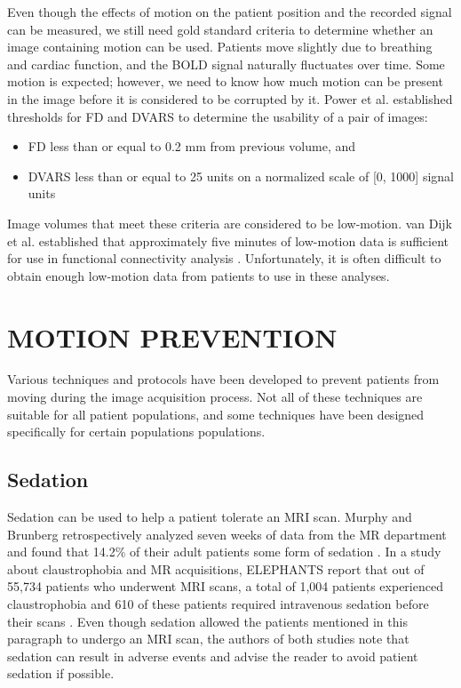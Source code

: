 Even though the effects of motion on the patient position and the recorded signal can be measured, we still need gold standard criteria to determine whether an image containing motion can be used. Patients move slightly due to breathing and cardiac function, and the BOLD signal naturally fluctuates over time. Some motion is expected; however, we need to know how much motion can be present in the image before it is considered to be corrupted by it. Power et al. established thresholds for FD and DVARS to determine the usability of a pair of images:
\begin{itemize}
\item FD less than or equal to 0.2 mm from previous volume, and
\item DVARS less than or equal to 25 units on a normalized scale of [0, 1000] signal units \cite{Power2014}
\end{itemize}

Image volumes that meet these criteria are considered to be low-motion. van Dijk et al. established that approximately five minutes of low-motion data is sufficient for use in functional connectivity analysis \cite{VanDijk2012}. Unfortunately, it is often difficult to obtain enough low-motion data from patients to use in these analyses.

\section{MOTION PREVENTION}

Various techniques and protocols have been developed to prevent patients from moving during the image acquisition process. Not all of these techniques are suitable for all patient populations, and some techniques have been designed specifically for certain populations populations.

\subsection{Sedation}

Sedation can be used to help a patient tolerate an MRI scan. Murphy and Brunberg retrospectively analyzed seven weeks of data from the MR department and found that 14.2\% of their adult patients some form of sedation \cite{Murphy1997}. In a study about claustrophobia and MR acquisitions, ELEPHANTS report that out of 55,734 patients who underwent MRI scans, a total of 1,004 patients experienced claustrophobia and 610 of these patients required intravenous sedation before their scans \cite{Dewey2007}. Even though sedation allowed the patients mentioned in this paragraph to undergo an MRI scan, the authors of both studies note that sedation can result in adverse events and advise the reader to avoid patient sedation if possible.


